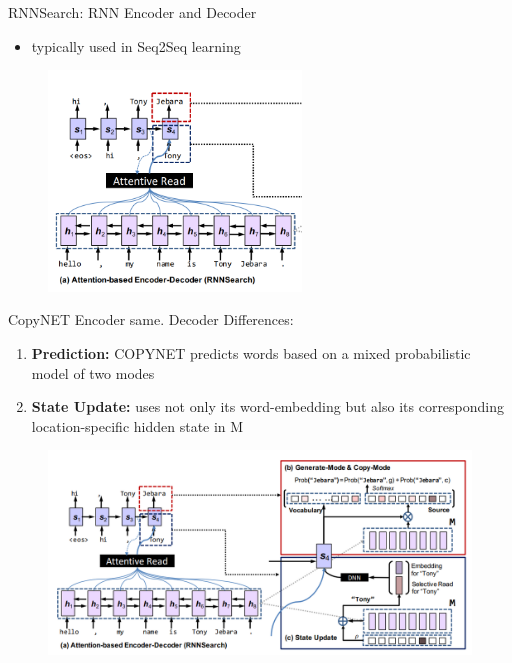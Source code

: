 \documentclass{beamer}
\begin{document}
\begin{frame}{RNNSearch: RNN Encoder and Decoder}
    \begin{itemize}
        \item typically used in Seq2Seq learning
    \end{itemize}
    \begin{figure}
        \centering
        \includegraphics[width=0.6\textwidth]{rnnsearc.PNG}
    \end{figure}
        
\end{frame}

\begin{frame}{CopyNET}
    Encoder same.
    Decoder Differences:
    \begin{enumerate}
        \item \textbf{Prediction:} COPYNET predicts words based on a mixed probabilistic model of two modes 
        \item \textbf{State Update:} uses not only its word-embedding but also its corresponding location-specific hidden state in M
    \end{enumerate}
    \pause
    \begin{figure}
        \centering
        \includegraphics[scale = 0.6]{copynet.PNG}
    \end{figure}
\end{frame}
\end{document}
